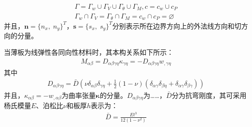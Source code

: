 \documentclass[a4paper]{article}
\begin{document}
\begin{equation}
    \begin{split}
        \Gamma=\Gamma_w\cup\Gamma_V\cup\Gamma_{\theta}\cup\Gamma_M,c=c_w\cup c_P\\
        \Gamma_w\cap\Gamma_V=\Gamma_{\theta}\cap\Gamma_M=c_w\cap c_P=\varnothing
    \end{split}
\end{equation}
并且，$\pmb{n}=\{n_x,\; n_y\}^T$，$\pmb{s}=\{s_x,\; s_y\}^T$分别表示所在边界方向上的外法线方向和切方向的分量。\par
当薄板为线弹性各同向性材料时，其本构关系如下所示：
\begin{equation}
    \begin{split}
        M_{\alpha\beta}=D_{\alpha\beta\gamma\eta}\kappa_{\gamma\eta}=-D_{\alpha\beta\gamma\eta}w_{,\gamma\eta}
    \end{split}
\end{equation}
其中
\begin{equation}
    \begin{split}
        D_{\alpha\beta\gamma\eta}=\bar D(\nu\delta_{\alpha\beta}\delta_{\gamma\eta}+\frac{1}{2}(1-\nu)(\delta_{\alpha\gamma}\delta_{\beta\eta}+\delta_{\alpha\gamma}\delta_{\beta\gamma}))
    \end{split}
\end{equation}
并且，$\kappa_{\alpha\beta}=-w_{,\alpha\beta}$为曲率张量$\boldsymbol \kappa$的分量。$D_{\alpha \beta \gamma \eta}$为……，$\bar{D}$分为抗弯刚度，其可采用杨氏模量$E$、泊松比$\nu$和板厚$h$表示为：
\begin{equation}
    \begin{split}
    \bar D=\frac{Et^3}{12(1-\nu^2)}
    \end{split}
    \end{equation}\par
\end{document}
